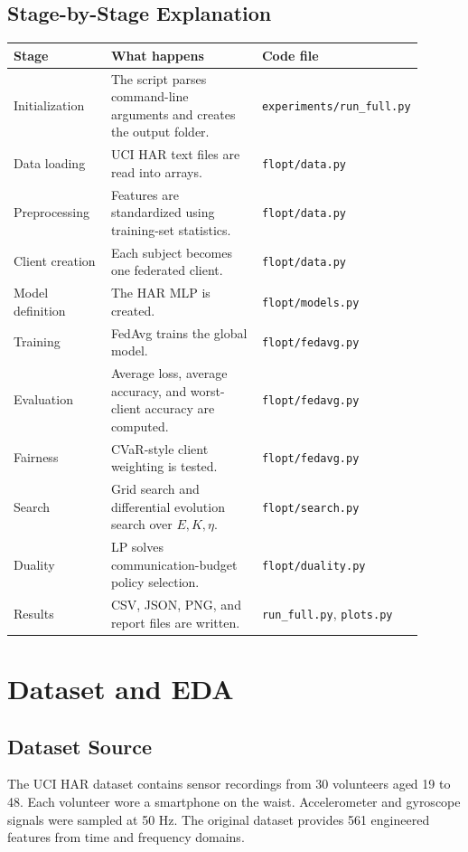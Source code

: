 \documentclass{article}
\begin{document}
\subsection{Stage-by-Stage Explanation}
\begin{longtable}{p{0.24\linewidth}p{0.38\linewidth}p{0.28\linewidth}}
\toprule
Stage & What happens & Code file \\
\midrule
Initialization & The script parses command-line arguments and creates the output folder. & \texttt{experiments/run\_full.py} \\
Data loading & UCI HAR text files are read into arrays. & \texttt{flopt/data.py} \\
Preprocessing & Features are standardized using training-set statistics. & \texttt{flopt/data.py} \\
Client creation & Each subject becomes one federated client. & \texttt{flopt/data.py} \\
Model definition & The HAR MLP is created. & \texttt{flopt/models.py} \\
Training & FedAvg trains the global model. & \texttt{flopt/fedavg.py} \\
Evaluation & Average loss, average accuracy, and worst-client accuracy are computed. & \texttt{flopt/fedavg.py} \\
Fairness & CVaR-style client weighting is tested. & \texttt{flopt/fedavg.py} \\
Search & Grid search and differential evolution search over \(E,K,\eta\). & \texttt{flopt/search.py} \\
Duality & LP solves communication-budget policy selection. & \texttt{flopt/duality.py} \\
Results & CSV, JSON, PNG, and report files are written. & \texttt{run\_full.py}, \texttt{plots.py} \\
\bottomrule
\end{longtable}

\section{Dataset and EDA}

\subsection{Dataset Source}
The UCI HAR dataset contains sensor recordings from 30 volunteers aged 19 to 48. Each volunteer wore a smartphone on the waist. Accelerometer and gyroscope signals were sampled at 50 Hz. The original dataset provides 561 engineered features from time and frequency domains.
\end{document}
